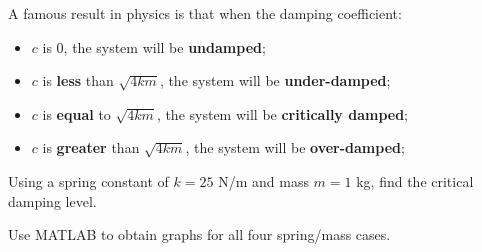 \newpage

A famous result in physics is that when the damping coefficient:
\begin{itemize}
\item $c$ is 0, the system will be {\bf undamped};
\item $c$ is {\bf less} than $\sqrt{4km}$, the system will be {\bf under-damped};
\item $c$ is {\bf equal} to $\sqrt{4km}$, the system will be {\bf
    critically damped};
\item $c$ is {\bf greater} than $\sqrt{4km}$, the system will be {\bf
    over-damped};
\end{itemize}

\problem Using a spring constant of $k = 25$ N/m and mass $m = 1$ kg,
find the critical damping level.

\newpage
\problem Use MATLAB to obtain graphs for all four spring/mass cases.

